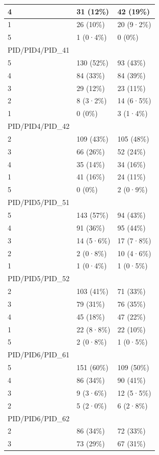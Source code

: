 \documentclass[
]{book}
\begin{document}
\begin{tabular}{l|l|l}
\hline
4 & 31 (12\%) & 42 (19\%)\\
\hline
1 & 26 (10\%) & 20 (9·2\%)\\
\hline
5 & 1 (0·4\%) & 0 (0\%)\\
\hline
PID/PID4/PID\_41 &  & \\
\hline
5 & 130 (52\%) & 93 (43\%)\\
\hline
4 & 84 (33\%) & 84 (39\%)\\
\hline
3 & 29 (12\%) & 23 (11\%)\\
\hline
2 & 8 (3·2\%) & 14 (6·5\%)\\
\hline
1 & 0 (0\%) & 3 (1·4\%)\\
\hline
PID/PID4/PID\_42 &  & \\
\hline
2 & 109 (43\%) & 105 (48\%)\\
\hline
3 & 66 (26\%) & 52 (24\%)\\
\hline
4 & 35 (14\%) & 34 (16\%)\\
\hline
1 & 41 (16\%) & 24 (11\%)\\
\hline
5 & 0 (0\%) & 2 (0·9\%)\\
\hline
PID/PID5/PID\_51 &  & \\
\hline
5 & 143 (57\%) & 94 (43\%)\\
\hline
4 & 91 (36\%) & 95 (44\%)\\
\hline
3 & 14 (5·6\%) & 17 (7·8\%)\\
\hline
2 & 2 (0·8\%) & 10 (4·6\%)\\
\hline
1 & 1 (0·4\%) & 1 (0·5\%)\\
\hline
PID/PID5/PID\_52 &  & \\
\hline
2 & 103 (41\%) & 71 (33\%)\\
\hline
3 & 79 (31\%) & 76 (35\%)\\
\hline
4 & 45 (18\%) & 47 (22\%)\\
\hline
1 & 22 (8·8\%) & 22 (10\%)\\
\hline
5 & 2 (0·8\%) & 1 (0·5\%)\\
\hline
PID/PID6/PID\_61 &  & \\
\hline
5 & 151 (60\%) & 109 (50\%)\\
\hline
4 & 86 (34\%) & 90 (41\%)\\
\hline
3 & 9 (3·6\%) & 12 (5·5\%)\\
\hline
2 & 5 (2·0\%) & 6 (2·8\%)\\
\hline
PID/PID6/PID\_62 &  & \\
\hline
2 & 86 (34\%) & 72 (33\%)\\
\hline
3 & 73 (29\%) & 67 (31\%)\\

\end{tabular}
\end{document}
